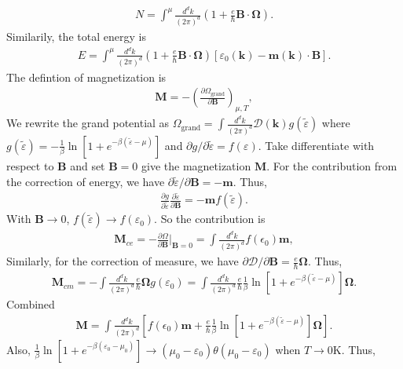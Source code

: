 \documentclass[12pt, oneside]{article}
\newcommand{\pa}{\partial}
\newcommand{\mr}[1]{\mathrm{#1}}
\newcommand{\p}[1]{\left(#1\right)}
\newcommand{\bb}[1]{\left[#1\right]}
\numberwithin{equation}{subsection}
\begin{document}
\begin{align}
	N = \int^{\mu} \frac{d^d k}{\p{2 \pi}^{d}} \p{1+\frac{e}{\hbar}\bm B\cdot\bm\Omega}.
\end{align}
Similarily, the total energy is 
\begin{align}
	\boxed{ E = \int^\mu \frac{d^d k}{\p{2 \pi}^{d}} \p{1+\frac{e}{\hbar}\bm B\cdot\bm\Omega} \bb{\varepsilon_0(\bm k)-\bm m(\bm k)\cdot\bm B}}.
\end{align}
The defintion of magnetization is 
\begin{align}
	\bm{M} = - \p{\frac{\pa \Omega_{\mr{grand}}}{\pa \bm{B}}}_{\mu, T},
\end{align}
We rewrite the grand potential as \(\Omega_{\mr{grand}} = \int \frac{d^d k}{\p{2 \pi}^{d}} \mathcal{D} \p{\bm{k}} g\p{\tilde{\varepsilon}}\) where \(g\p{\tilde{\varepsilon}} = -\frac{1}{\beta} \ln \bb{1 + e^{-\beta \p{\tilde{\varepsilon} - \mu}}}\) and \(\pa g/ \pa \tilde{\varepsilon} = f \p{\varepsilon}\). Take differentiate with respect to \(\bm{B}\) and set \(\bm{B} = 0\) give the magnetization \(\bm{M}\). For the contribution from the correction of energy, we have \(\pa \tilde{\varepsilon} / \pa \bm{B} = - \bm{m}\). Thus,
\begin{align}
	\frac{\pa g}{\pa \tilde{\varepsilon}} \frac{\pa \tilde{\varepsilon}}{\pa \bm{B}} = -\bm{m} f \p{\tilde{\varepsilon}}.
\end{align}
With \(\bm{B} \rightarrow 0\), \(f \p{\tilde{\varepsilon}} \rightarrow f \p{\varepsilon_0}\). So the contribution is 
\begin{align}
	\bm{M}_{ce} = -\frac{\pa \Omega}{\pa \bm{B}} \bigg|_{\bm{B} = 0} = \int \frac{d^d k}{\p{2 \pi}^{d}} f\p{\epsilon_0} \bm{m},
\end{align}
Similarly, for the correction of measure, we have \(\pa \mathcal{D} / \pa \bm{B} = \frac{e}{\hbar} \bm{\Omega}\). Thus,
\begin{align}
	\bm{M}_{cm} =  -\int \frac{d^d k}{\p{2 \pi}^{d}} \frac{e}{\hbar}\bm\Omega g(\varepsilon_0) = \int \frac{d^d k}{\p{2 \pi}^{d}} \frac{e}{\hbar} \frac{1}{\beta} \ln \bb{1 + e^{-\beta \p{\tilde{\varepsilon} - \mu}}} \bm{\Omega}.
\end{align}
Combined 
\begin{align}
	\bm{M} =  \int \frac{d^d k}{\p{2 \pi}^{d}}  \bb{f\p{\epsilon_0} \bm{m} + \frac{e}{\hbar} \frac{1}{\beta} \ln \bb{1 + e^{-\beta \p{\tilde{\varepsilon} - \mu}}} \bm{\Omega}}.
\end{align}
Also, \(\frac{1}{\beta} \ln \bb{1+e^{-\beta(\varepsilon_0-\mu_0)}} \rightarrow \p{\mu_0-\varepsilon_0} \theta\p{\mu_0-\varepsilon_0}\) when \(T \rightarrow 0 \mr{K}\). Thus, 
\end{document}

